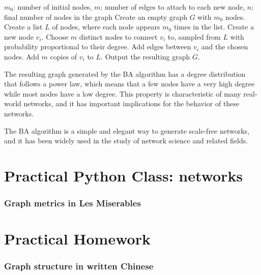 \begin{algorithmic}[1]
\Require $m_0$: number of initial nodes, $m$: number of edges to attach to each new node, $n$: final number of nodes in the graph
\State Create an empty graph $G$ with $m_0$ nodes.
\State Create a list $L$ of nodes, where each node appears $m_0$ times in the list.
    \State Create a new node $v_i$.
    \State Choose $m$ distinct nodes to connect $v_i$ to, sampled from $L$ with probability proportional to their degree.
    \State Add edges between $v_i$ and the chosen nodes.
    \State Add $m$ copies of $v_i$ to $L$.
\EndFor
\State Output the resulting graph $G$.
\end{algorithmic}

The resulting graph generated by the BA algorithm has a degree distribution that follows a power law, which means that a few nodes have a very high degree while most nodes have a low degree. This property is characteristic of many real-world networks, and it has important implications for the behavior of these networks.

The BA algorithm is a simple and elegant way to generate scale-free networks, and it has been widely used in the study of network science and related fields.

\section{Practical Python Class: networks}

\subsubsection*{Graph metrics in Les Miserables}



\section{Practical Homework}

\subsubsection*{Graph structure in written Chinese}

